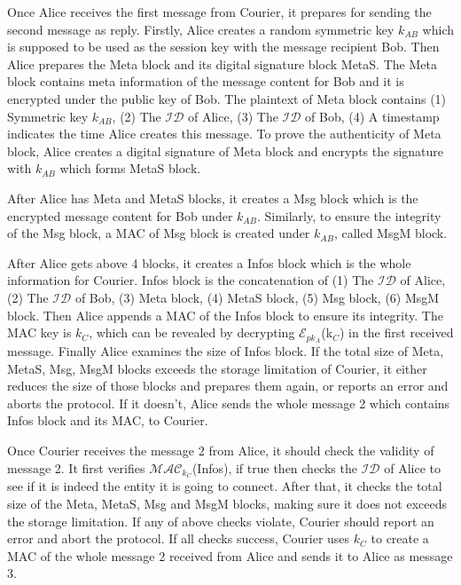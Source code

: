 Once Alice receives the first message from Courier, it prepares for sending the second message as reply. Firstly, Alice creates a random symmetric key $ k_{AB} $ which is supposed to be used as the session key with the message recipient Bob. Then Alice prepares the Meta block and its digital signature block MetaS. The Meta block contains  meta information of the message content for Bob and it is encrypted under the public key of Bob. The plaintext of Meta block contains (1) Symmetric key $ k_{AB} $, (2) The $ \mathcal{ID} $ of Alice, (3) The $ \mathcal{ID} $ of Bob, (4) A timestamp indicates the time Alice creates this message. To prove the authenticity of Meta block, Alice creates a digital signature of Meta block and encrypts the signature with $ k_{AB} $ which forms MetaS block. \par

After Alice has Meta and MetaS blocks, it creates a Msg block which is the encrypted message content for Bob under $ k_{AB} $. Similarly, to ensure the integrity of the Msg block, a MAC of Msg block is created under $ k_{AB} $, called MsgM block. \par

After Alice gets above 4 blocks, it creates a Infos block which is the whole information for Courier. Infos block is the concatenation of (1) The $ \mathcal{ID} $ of Alice, (2) The $ \mathcal{ID} $ of Bob, (3) Meta block, (4) MetaS block, (5) Msg block, (6) MsgM block. Then Alice appends a MAC of the Infos block to ensure its integrity. The MAC key is $ k_C $, which can be revealed by decrypting $\mathcal{E}_{pk_A}$(k$_C$) in the first received message. Finally Alice examines the size of Infos block. If the total size of Meta, MetaS, Msg, MsgM blocks exceeds the storage limitation of Courier, it either reduces the size of those blocks and prepares them again, or reports an error and aborts the protocol. If it doesn't, Alice sends the whole message 2 which contains Infos block and its MAC, to Courier. \par

Once Courier receives the message 2 from Alice, it should check the validity of message 2. It first verifies $ \mathcal{MAC}_{k_C} $(Infos), if true then checks the $ \mathcal{ID} $ of Alice to see if it is indeed the entity it is going to connect. After that, it checks the total size of the Meta, MetaS, Msg and MsgM blocks, making sure it does not exceeds the storage limitation. If any of above checks violate, Courier should report an error and abort the protocol. If all checks success, Courier uses $ k_C $ to create a MAC of the whole message 2 received from Alice and sends it to Alice as message 3. \par

